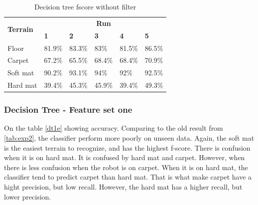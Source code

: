 \documentclass[USenglish]{ifimaster}  %
\begin{document}
\begin{table}[h]
	\centering
	\begin{tabular}{@{}llllll@{}}
		\toprule
		\multirow{2}{*}{\textbf{Terrain}} & \multicolumn{5}{c}{\textbf{Run}} \\ \cmidrule(l){2-6} 
		& \multicolumn{1}{l|}{\textbf{1}} & \multicolumn{1}{l|}{\textbf{2}} & \multicolumn{1}{l|}{\textbf{3}} & \multicolumn{1}{l|}{\textbf{4}} & \textbf{5} \\ \midrule
		\multicolumn{1}{l|}{Floor} & \multicolumn{1}{l|}{81.9\%} & \multicolumn{1}{l|}{83.3\%} & \multicolumn{1}{l|}{83\%} & \multicolumn{1}{l|}{81.5\%} & 86.5\% \\ \midrule
		\multicolumn{1}{l|}{Carpet} & \multicolumn{1}{l|}{67.2\%} & \multicolumn{1}{l|}{65.5\%} & \multicolumn{1}{l|}{68.4\%} & \multicolumn{1}{l|}{68.4\%} & 70.9\% \\ \midrule
		\multicolumn{1}{l|}{Soft mat} & \multicolumn{1}{l|}{90.2\%} & \multicolumn{1}{l|}{93.1\%} & \multicolumn{1}{l|}{94\%} & \multicolumn{1}{l|}{92\%} & 92.5\% \\ \midrule
		\multicolumn{1}{l|}{Hard mat} & \multicolumn{1}{l|}{39.4\%} & \multicolumn{1}{l|}{45.3\%} & \multicolumn{1}{l|}{45.9\%} & \multicolumn{1}{l|}{39.4\%} & 49.3\% \\ \bottomrule
	\end{tabular}
	\caption{Decision tree fscore without filter}
	\label{dtfscore}
\end{table}
\FloatBarrier

\subsubsection{Decision Tree - Feature set one}
On the table \ref{dt1e} showing accuracy. Comparing to the old result from \ref{tab:exp2}, the classifier perform more poorly on unseen data. Again, the soft mat is the easiest terrain to recognize, and has the highest f-score. There is confusion when it is on hard mat. It is confused by hard mat and carpet. However, when there is less confusion when the robot is on carpet. When it is on hard mat, the classifier tend to predict carpet than hard mat. That is what make carpet have a hight precision, but low recall. However, the hard mat has a higher recall, but lower precision.  
\end{document}
